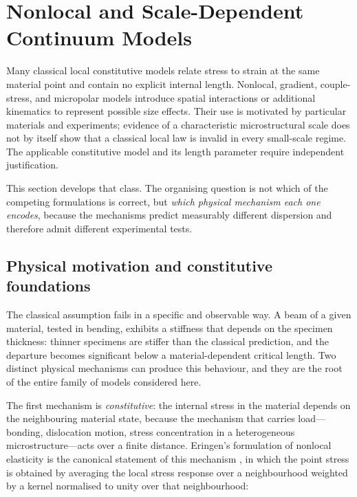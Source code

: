 \section{Nonlocal and Scale-Dependent Continuum Models}
\label{sec:nonlocal}

Many classical local constitutive models relate stress to strain at the same material point and contain no explicit internal length. Nonlocal, gradient, couple-stress, and micropolar models introduce spatial interactions or additional kinematics to represent possible size effects. Their use is motivated by particular materials and experiments; evidence of a characteristic microstructural scale does not by itself show that a classical local law is invalid in every small-scale regime. The applicable constitutive model and its length parameter require independent justification.

This section develops that class. The organising question is not which of the competing formulations is correct, but \emph{which physical mechanism each one encodes}, because the mechanisms predict measurably different dispersion and therefore admit different experimental tests.

\subsection{Physical motivation and constitutive foundations}
\label{sec:7.1}

The classical assumption fails in a specific and observable way. A beam of a given material, tested in bending, exhibits a stiffness that depends on the specimen thickness: thinner specimens are stiffer than the classical prediction, and the departure becomes significant below a material-dependent critical length. Two distinct physical mechanisms can produce this behaviour, and they are the root of the entire family of models considered here.

The first mechanism is \emph{constitutive}: the internal stress in the material depends on the neighbouring material state, because the mechanism that carries load---bonding, dislocation motion, stress concentration in a heterogeneous microstructure---acts over a finite distance. Eringen's formulation of nonlocal elasticity is the canonical statement of this mechanism \cite{Eringen1972,Eringen1974,Eringen2002}, in which the point stress is obtained by averaging the local stress response over a neighbourhood weighted by a kernel normalised to unity over that neighbourhood:

